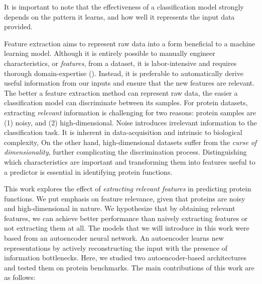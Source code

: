 \noindent It is important to note that the effectiveness of a classification
model strongly depends on the pattern it learns, and how well it represents
the input data provided.

\par Feature extraction aims to represent raw data into a form beneficial to
a machine learning model. Although it is entirely possible to manually
engineer characteristics, or \textit{features}, from a dataset, it is
labor-intensive and requires thorough domain-expertise
(\cite{bengio2013representation}). Instead, it is preferable to automatically
derive useful information from our inputs and ensure that the new features
are relevant. The better a feature extraction method can represent raw data,
the easier a classification model can discriminate between its samples. For
protein datasets, extracting \textit{relevant} information is challenging for
two reasons: protein samples are (1) noisy, and (2) high-dimensional. Noise
introduces irrelevant information to the classification task. It is inherent
in data-acquisition and intrinsic to biological complexity, On the other
hand, high-dimensional datasets suffer from the \textit{curse of
dimensionality}, further complicating the discrimination process.
Distinguishing which characteristics are important and transforming them into
features useful to a predictor is essential in identifying protein functions.

\newpage

\par This work explores the effect of \textit{extracting relevant features} in
predicting protein functions. We put emphasis on feature relevance, given that
proteins are noisy and high-dimensional in nature. We hypothesize that by
obtaining relevant features, we can achieve better performance than naively
extracting features or not extracting them at all. The models that we will
introduce in this work were based from an autoencoder neural network.  An
autoencoder learns new representations by actively reconstructing the input
with the presence of information bottlenecks. Here, we studied two
autoencoder-based architectures and tested them on protein benchmarks.  The
main contributions of this work are as follows:

